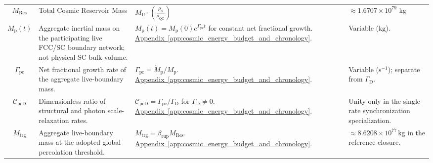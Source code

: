 \begin{longtable}{@{} c p{5.5cm} p{4cm} p{3.5cm} @{}}
$M_{\mathrm{Res}}$ & Total Cosmic Reservoir Mass & $M_{\mathrm{U}} \cdot \left(\frac{\rho_{\mathrm{S}}}{\rho_{\mathrm{QG}}}\right)$ & $\approx 1.6707 \times 10^{79}$ kg \\

$M_{\mathrm p}(t)$ & {\raggedright Aggregate inertial mass on the participating live FCC/SC boundary network; not physical SC bulk volume.\par} & {\raggedright $M_{\mathrm p}(t)=M_{\mathrm p}(0)e^{\Gamma_{\mathrm{pc}}t}$ for constant net fractional growth. \newline \hyperref[app:cosmic_energy_budget_and_chronology]{Appendix~\ref*{app:cosmic_energy_budget_and_chronology}}.\par} & {\raggedright Variable ($\mathrm{kg}$).\par} \\

$\Gamma_{\mathrm{pc}}$ & {\raggedright Net fractional growth rate of the aggregate live-boundary mass.\par} & {\raggedright $\Gamma_{\mathrm{pc}}=\dot M_{\mathrm p}/M_{\mathrm p}$. \newline \hyperref[app:cosmic_energy_budget_and_chronology]{Appendix~\ref*{app:cosmic_energy_budget_and_chronology}}.\par} & {\raggedright Variable ($\mathrm{s^{-1}}$); separate from $\Gamma_{\mathrm D}$.\par} \\

$\mathcal C_{\mathrm{pcD}}$ & {\raggedright Dimensionless ratio of structural and photon scale-relaxation rates.\par} & {\raggedright $\mathcal C_{\mathrm{pcD}}=\Gamma_{\mathrm{pc}}/\Gamma_{\mathrm D}$ for $\Gamma_{\mathrm D}\ne0$. \newline \hyperref[app:cosmic_energy_budget_and_chronology]{Appendix~\ref*{app:cosmic_energy_budget_and_chronology}}.\par} & {\raggedright Unity only in the single-rate synchronization specialization.\par} \\


$M_{\mathrm{trg}}$ & {\raggedright Aggregate live-boundary mass at the adopted global percolation threshold.\par} & {\raggedright $M_{\mathrm{trg}}=\beta_{\mathrm{rup}}M_{\mathrm{Res}}$. \newline \hyperref[app:cosmic_energy_budget_and_chronology]{Appendix~\ref*{app:cosmic_energy_budget_and_chronology}}.\par} & {\raggedright $\approx8.6208\times10^{77}\,\mathrm{kg}$ in the reference closure.\par} \\


\end{longtable}
